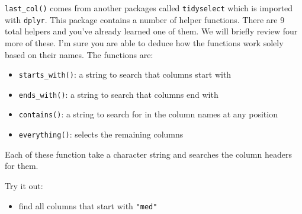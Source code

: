 \documentclass[
]{book}
\providecommand{\tightlist}{%
  \setlength{\itemsep}{0pt}\setlength{\parskip}{0pt}}
\begin{document}
\texttt{last\_col()} comes from another packages called \texttt{tidyselect} which is imported with \texttt{dplyr}. This package contains a number of helper functions. There are 9 total helpers and you've already learned one of them. We will briefly review four more of these. I'm sure you are able to deduce how the functions work solely based on their names. The functions are:

\begin{itemize}
\tightlist
\item
  \texttt{starts\_with()}: a string to search that columns start with
\item
  \texttt{ends\_with()}: a string to search that columns end with
\item
  \texttt{contains()}: a string to search for in the column names at any position
\item
  \texttt{everything()}: selects the remaining columns
\end{itemize}

Each of these function take a character string and searches the column headers for them.

Try it out:

\begin{itemize}
\tightlist
\item
  find all columns that start with \texttt{"med"}
\end{itemize}
\end{document}
